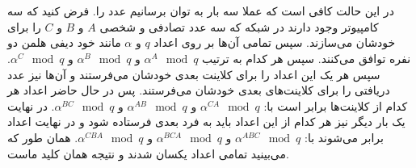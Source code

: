 \documentclass[]{article}
\begin{document}
\section{}
در این حالت کافی است که عملا سه بار به توان برسانیم عدد را.
فرض کنید که سه کامپیوتر وجود دارند در شبکه که سه عدد تصادفی و شخصی
$A$ و $B$ و $C$
را برای خودشان می‌سازند. سپس تمامی آن‌ها بر روی اعداد
$q$ و $\alpha$
مانند خود دیفی هلمن دو نفره توافق می‌کنند. سپس هر کدام به ترتیب
$\alpha^A \mod q$ و $\alpha^B \mod q$ و $\alpha^C \mod q$.
سپس هر یک این اعداد را برای کلاینت بعدی خودشان می‌فرستند و آن‌ها نیز عدد دریافتی را برای کلاینت‌های
بعدی خودشان می‌فرستند. پس در حال حاضر اعداد هر کدام از کلاینت‌ها برابر است با:
$\alpha^{CA} \mod q$ و $\alpha^{AB} \mod q$ و $\alpha^{BC} \mod q$.
در نهایت یک بار دیگر نیز هر کدام از این اعداد باید به فرد بعدی فرستاده شود و در نهایت اعداد برابر می‌شوند با:
$\alpha^{ABC} \mod q$ و $\alpha^{BCA} \mod q$ و $\alpha^{CBA} \mod q$.
همان طور که می‌بینید تمامی اعداد یکسان شدند و نتیجه همان کلید ماست.

\noindent
{}
\end{document}
